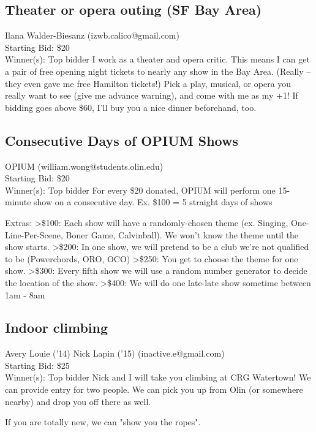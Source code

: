 \documentclass[11pt]{article}
\begin{document}
\subsection{Theater or opera outing (SF Bay Area)}
Ilana Walder-Biesanz (izwb.calico@gmail.com) \\
Starting Bid: \$20 \\
Winner(s): 
Top bidder\newline
I work as a theater and opera critic. This means I can get a pair of free opening night tickets to nearly any show in the Bay Area. (Really -- they even gave me free Hamilton tickets!) Pick a play, musical, or opera you really want to see (give me advance warning), and come with me as my +1! If bidding goes above \$60, I'll buy you a nice dinner beforehand, too.
\subsection{Consecutive Days of OPIUM Shows}
OPIUM (william.wong@students.olin.edu) \\
Starting Bid: \$20 \\
Winner(s): 
Top bidder\newline
For every \$20 donated, OPIUM will perform one 15-minute show on a consecutive day.  Ex. \$100 = 5 straight days of shows

Extras:
\textgreater \$100: Each show will have a randomly-chosen theme (ex. Singing, One-Line-Per-Scene, Boner Game, Calvinball).  We won't know the theme until the show starts.
\textgreater \$200: In one show, we will pretend to be a club we're not qualified to be (Powerchords, ORO, OCO)
\textgreater \$250: You get to choose the theme for one show.
\textgreater \$300: Every fifth show we will use a random number generator to decide the location of the show.
\textgreater \$400: We will do one late-late show sometime between 1am - 8am
\subsection{Indoor climbing}
Avery Louie ('14) Nick Lapin ('15) (inactive.e@gmail.com) \\
Starting Bid: \$25 \\
Winner(s): 
Top bidder\newline
Nick and I will take you climbing at CRG Watertown!  We can provide entry for two people.  We can pick you up from Olin (or somewhere nearby) and drop you off there as well.

If you are totally new, we can "show you the ropes".
\end{document}

